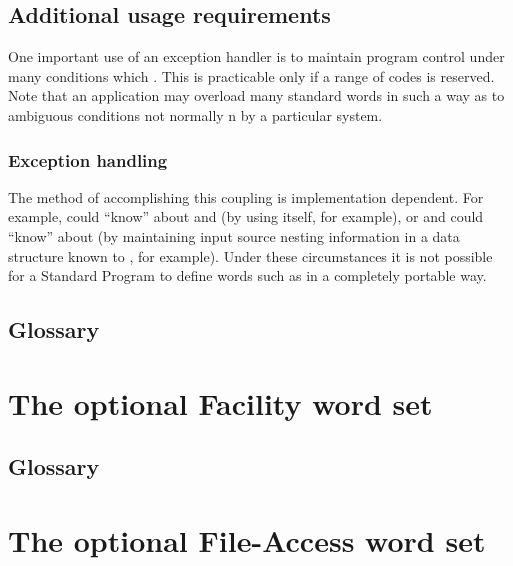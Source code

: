 \setcounter{subsection}{2}
\subsection{Additional usage requirements} %

One important use of an exception handler is to maintain program
control under many conditions which .  This is practicable
only if a range of codes is reserved.  Note that an application may
overload many standard words in such a way as to 
ambiguous conditions not normally n by a particular
system.

\setcounter{subsubsection}{5}
\subsubsection{Exception handling} %

The method of accomplishing this coupling is implementation dependent.
For example,  could ``know'' about  and
 (by using  itself, for example), or
 and  could ``know'' about 
(by maintaining input source nesting information in a data structure
known to , for example). Under these circumstances it is
not possible for a Standard Program to define words such as
 in a completely portable way.

\setcounter{subsection}{5}
\subsection{Glossary} %



\section{The optional Facility word set} %
\label{rat:facility}

\setcounter{subsection}{5}
\subsection{Glossary} %



\section{The optional File-Access word set} %
\label{rat:file}

